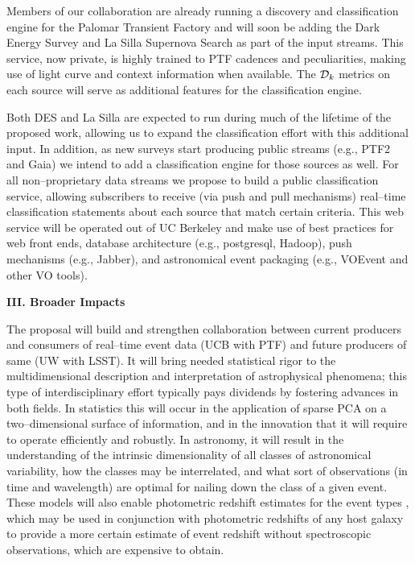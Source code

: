  \smallskip

Members of our collaboration are already running a discovery and classification
engine for the Palomar Transient Factory and will soon be adding the Dark Energy
Survey and La Silla Supernova Search as part of the input streams.  This
service, now private, is highly trained to PTF cadences and peculiarities,
making use of light curve and context information when available. The ${\cal
D}_k$ metrics on each source will serve as additional features for the
classification engine.

Both DES and La Silla are expected to run during much of the lifetime of the
proposed work, allowing us to expand the classification effort with this
additional input. In addition, as new surveys start producing public streams
(e.g., PTF2 and Gaia) we intend to add a classification engine for those sources
as well.  For all non--proprietary data streams we propose to build a public
classification service, allowing subscribers to receive (via push and pull
mechanisms) real--time classification statements about each source that match
certain criteria. This web service will be operated out of UC Berkeley and make
use of best practices for web front ends, database architecture (e.g.,
postgresql, Hadoop), push mechanisms (e.g., Jabber), and astronomical event
packaging (e.g., VOEvent and other VO tools).

\smallskip %

\bigskip \centerline{\bf III. Broader Impacts} \smallskip

The proposal will build and strengthen collaboration between current producers
and consumers of real--time event data (UCB with PTF) and future producers of
same (UW with LSST).  It will bring needed statistical rigor to the
multidimensional description and interpretation of astrophysical phenomena; this
type of interdisciplinary effort typically pays dividends by fostering advances
in both fields.  In statistics this will occur in the application of sparse PCA
on a two--dimensional surface of information, and in the innovation that it will
require to operate efficiently and robustly.  In astronomy, it will result in
the understanding of the intrinsic dimensionality of all classes of astronomical
variability, how the classes may be interrelated, and what sort of observations
(in time and wavelength) are optimal for nailing down the class of a given
event.  These models will also enable photometric redshift estimates for the
event types \citep[e.g.][]{2010ApJ...717...40K}, which may be used in
conjunction with photometric redshifts of any host galaxy
\citep[e.g.][]{1962IAUS...15..390B} to provide a more certain estimate of event
redshift without spectroscopic observations, which are expensive to obtain.

